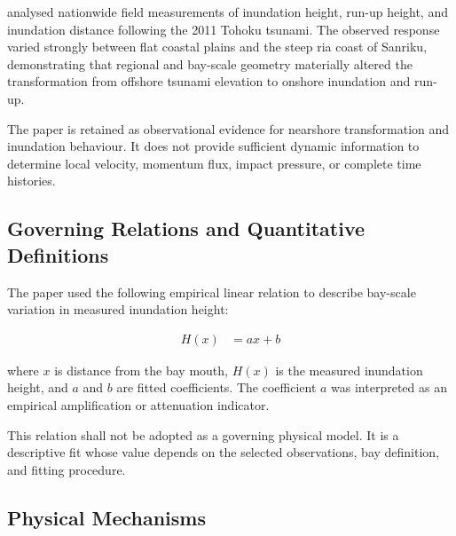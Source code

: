 \textcite{mori2012nationwide} analysed nationwide field measurements of inundation height, run-up height, and inundation distance following the 2011 Tohoku tsunami. The observed response varied strongly between flat coastal plains and the steep ria coast of Sanriku, demonstrating that regional and bay-scale geometry materially altered the transformation from offshore tsunami elevation to onshore inundation and run-up. 

The paper is retained as observational evidence for nearshore transformation and inundation behaviour. It does not provide sufficient dynamic information to determine local velocity, momentum flux, impact pressure, or complete time histories.

\subsection{Governing Relations and Quantitative Definitions}
\label{sec:res-phy-nrs-governing-relations}

%

The paper used the following empirical linear relation to describe bay-scale variation in measured inundation height:

\begin{align} 
    H(x) &= a x + b \label{eq:res-phy-nrs-mori-bay-amplification}
\end{align} 

where $x$ is distance from the bay mouth, $H(x)$ is the measured inundation height, and $a$ and $b$ are fitted coefficients. The coefficient $a$ was interpreted as an empirical amplification or attenuation indicator. 

This relation shall not be adopted as a governing physical model. It is a descriptive fit whose value depends on the selected observations, bay definition, and fitting procedure.

\subsection{Physical Mechanisms}
\label{sec:res-phy-nrs-physical-mechanisms}


